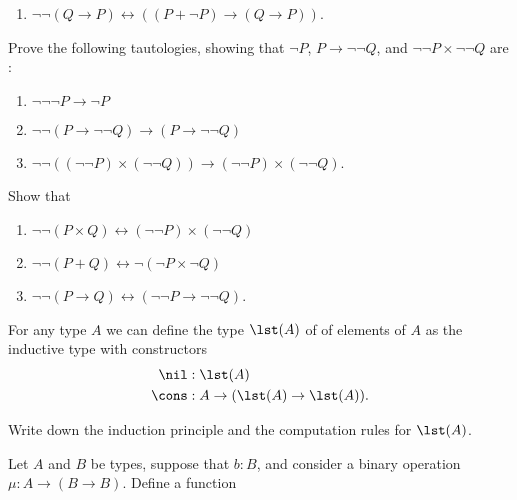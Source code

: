 \begin{exercises}
\begin{subexenum}
\begin{enumerate}
    \item $\neg\neg(Q\to P)\leftrightarrow ((P+\neg P)\to (Q\to P))$.    
    \end{enumerate}
  \item Prove the following tautologies, showing that $\neg P$, $P\to\neg\neg Q$, and $\neg\neg P\times\neg\neg Q$ are :
    \begin{enumerate}
    \item $\neg\neg\neg P \to \neg P$
    \item $\neg\neg(P \to \neg\neg Q)\to (P\to\neg\neg Q)$
    \item $\neg\neg((\neg\neg P)\times(\neg\neg Q))\to (\neg\neg P)\times(\neg\neg Q)$.
    \end{enumerate}
  \item Show that
    \begin{enumerate}
    \item $\neg\neg(P\times Q)\leftrightarrow (\neg\neg P)\times(\neg\neg Q)$
    \item $\neg\neg(P+Q)\leftrightarrow \neg (\neg P \times \neg Q)$
    \item $\neg\neg(P\to Q)\leftrightarrow (\neg\neg P\to\neg\neg Q)$.
    \end{enumerate}
  \end{subexenum}
\exitem \label{ex:lists}For any type $A$ we can define the type $\lst(A)$ of  of elements of $A$ as the inductive type with constructors
  \begin{align*}
    \nil & : \lst(A) \\*
    \cons & : A \to (\lst(A) \to \lst(A)).
  \end{align*}
  \begin{subexenum}
  \item Write down the induction principle and the computation rules for $\lst(A)$.
  \item Let $A$ and $B$ be types, suppose that $b:B$, and consider a binary operation $\mu:A\to (B \to B)$. Define a function

\end{subexenum}
\end{exercises}
